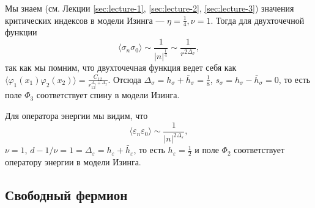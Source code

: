 \documentclass[a4paper,12pt]{article}
\theoremstyle{definition}
\theoremstyle{definition}
\theoremstyle{definition}
\begin{document}
Мы знаем (см. Лекции \ref{sec:lecture-1}, \ref{sec:lecture-2}, \ref{sec:lecture-3}) значения критических индексов в модели Изинга --- $\eta=\frac{1}{4}, \nu=1$. Тогда для двухточечной функции
\begin{equation}
  \label{eq:280}
  \langle \sigma_{n} \sigma_{0} \rangle\sim \frac{1}{|n|^{\frac{1}{4}}} \sim\frac{1}{r^{2\Delta_{\sigma}}},
\end{equation}
так как мы помним, что двухточечная функция ведет себя как $\langle \varphi_{1}(x_{1}) \varphi_{2}(x_{2})\rangle=\frac{C_{12}}{r_{12}^{\Delta_{1}+\Delta_{2}}}$. Отсюда $\Delta_{\sigma}=h_{\sigma}+\bar h_{\sigma}=\frac{1}{8}$, $s_{\sigma}=h_{\sigma}-\bar h_{\sigma}=0$, то есть поле $\Phi_{3}$ соответствует спину в модели Изинга. 

Для оператора энергии мы видим, что
\begin{equation}
  \label{eq:281}
  \langle\varepsilon_{n}\varepsilon_{0}\rangle\sim \frac{1}{|n|^{2\Delta_{\varepsilon}}},
\end{equation}
$\nu=1$, $d-1/\nu=1=\Delta_{\varepsilon}=h_{\varepsilon}+\bar h_{\varepsilon}$, то есть $h_{\varepsilon}=\frac{1}{2}$ и поле $\Phi_{2}$ соответствует оператору энергии в модели Изинга.

\subsection{Свободный фермион}
\label{sec:free-fermion}
\end{document}
